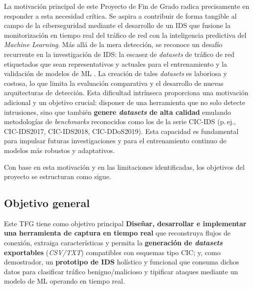 La motivación principal de este Proyecto de Fin de Grado radica precisamente en responder a esta necesidad crítica. Se aspira a contribuir de forma tangible al campo de la ciberseguridad mediante el desarrollo de un IDS que fusione la monitorización en tiempo real del tráfico de red con la inteligencia predictiva del \textit{Machine Learning}. Más allá de la mera detección, se reconoce un desafío recurrente en la investigación de IDS: la escasez de \textit{datasets} de tráfico de red etiquetados que sean representativos y actuales para el entrenamiento y la validación de modelos de ML \cite{PolaniaArias2021EvaluacionMLIDS}. La creación de tales \textit{datasets} es laboriosa y costosa, lo que limita la evaluación comparativa y el desarrollo de nuevas arquitecturas de detección. Esta dificultad intrínseca proporciona una motivación adicional y un objetivo crucial: disponer de una herramienta que no solo detecte intrusiones, sino que también \textbf{genere \textit{datasets} de alta calidad} emulando metodologías de \textit{benchmarks} reconocidos como los de la serie CIC-IDS (p.\,ej., CIC-IDS2017, CIC-IDS2018, CIC-DDoS2019). Esta capacidad es fundamental para impulsar futuras investigaciones y para el entrenamiento continuo de modelos más robustos y adaptativos.

Con base en esta motivación y en las limitaciones identificadas, los objetivos del proyecto se estructuran como sigue.

\subsection*{Objetivo general}
Este TFG tiene como objetivo principal \textbf{Diseñar, desarrollar e implementar una herramienta de captura en tiempo real} que reconstruya flujos de conexión, extraiga características y permita la \textbf{generación de \textit{datasets} exportables} (\emph{CSV/TXT}) compatibles con esquemas tipo CIC; y, como demostrador, un \textbf{prototipo de IDS} holístico y funcional que consuma dichos datos para clasificar tráfico benigno/malicioso y tipificar ataques mediante un modelo de ML operando en tiempo real.

